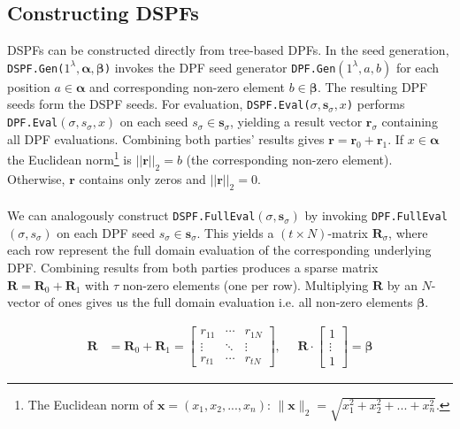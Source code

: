\subsection{Constructing DSPFs}
\label{subseq:constructingTBDSPFs}
DSPFs can be constructed directly from tree-based DPFs. In the seed generation, \texttt{DSPF.Gen($1^\lambda, \boldsymbol{\alpha}, \boldsymbol{\beta}$)} invokes the DPF seed generator \texttt{DPF.Gen}$(1^\lambda, a, b)$ for each position $a \in \boldsymbol{\alpha}$ and corresponding non-zero element $b \in \boldsymbol{\beta}$. The resulting DPF seeds form the DSPF seeds. For evaluation, \texttt{DSPF.Eval($\sigma, \boldsymbol{s}_\sigma, x$)}  performs \texttt{DPF.Eval}$(\sigma, s_\sigma, x)$ on each seed $s_\sigma\in\boldsymbol{s}_\sigma$, yielding a result vector $\boldsymbol{r}_\sigma$ containing all DPF evaluations. Combining both parties' results gives $\boldsymbol{r} = \boldsymbol{r}_0 + \boldsymbol{r}_1$. If $x\in\boldsymbol{\alpha}$ the Euclidean norm\footnote{The Euclidean norm of \(\mathbf{x} = (x_1, x_2, ..., x_n)\): \(\|\mathbf{x}\|_2 = \sqrt{x_1^2 + x_2^2 + ... + x_n^2}\).}  is $||\boldsymbol{r}||_2=b$ (the corresponding non-zero element).  Otherwise, $\boldsymbol{r}$ contains only zeros and $||\boldsymbol{r}||_2=0$.
\\\\
We can analogously construct \texttt{DSPF.FullEval}$(\sigma, \boldsymbol{s}_\sigma)$ by invoking \texttt{DPF.FullEval}$(\sigma, s_\sigma)$ on each DPF seed $s_\sigma\in\boldsymbol{s}_\sigma$. This yields a $(t\times N)$-matrix $\boldsymbol{R}_\sigma$, where each row represent the full domain evaluation of the corresponding underlying DPF. Combining results from both parties produces a sparse matrix $\boldsymbol{R} = \boldsymbol{R}_0 + \boldsymbol{R}_1$ with $\tau$ non-zero elements (one per row).  Multiplying $\boldsymbol{R}$ by an $N$-vector of ones gives us the full domain evaluation i.e. all non-zero elements $\boldsymbol{\beta}$.

\begin{equation}
\begin{aligned}
\boldsymbol{R} &= \boldsymbol{R}_0 + \boldsymbol{R}_1 = \begin{bmatrix} r_{11} & \cdots & r_{1N} \\ \vdots & \ddots & \vdots \\ r_{t1} & \cdots & r_{tN} \end{bmatrix}, \:\:\:\:\:\:  \boldsymbol{R} \cdot \begin{bmatrix} 1 \\ \vdots \\ 1 \end{bmatrix} = \boldsymbol{\beta}
\end{aligned}
\end{equation}

